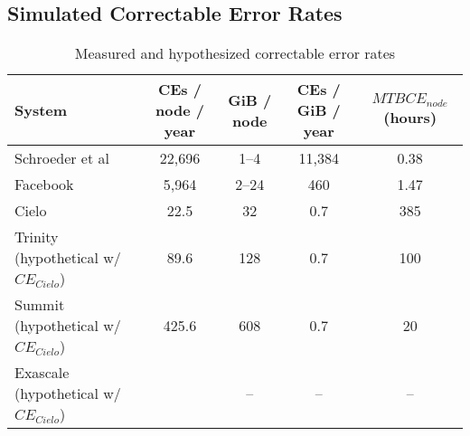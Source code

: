 \subsection{Simulated Correctable Error Rates}



\begin{table*} 
        \centering 
        \begin{tabular}{ l c c c c } 
         \toprule
                System & CEs / node / year & GiB / node & CEs / GiB / year & $MTBCE_{node}$ (hours)\\
         \midrule
                Schroeder et al~\cite{Schroeder:09:dram}  & 22,696 & 1--4 & 11,384 & 0.38\\
                Facebook~\cite{meza:2015:revisiting} & 5,964 & 2--24 & 460 & 1.47\\ %
                Cielo~\cite{levy:2018:lessons} & 22.5 & 32 & 0.7 & 385 \\ %
                Trinity~\cite{Trinity} (hypothetical w/ $CE_{Cielo}$)  &  89.6 & 128 & 0.7 & 100\\   %
                Summit~\cite{Summit} (hypothetical w/ $CE_{Cielo}$)  &  425.6 & 608 & 0.7 & 20\\   %
                Exascale (hypothetical w/ $CE_{Cielo}$) &  & -- & -- & -- \\
         \bottomrule
        \end{tabular}
        \vspace{.6em}
        \caption{ 
                Measured and hypothesized correctable error rates
        }
        \label{tab:CE_rate}
\end{table*}

